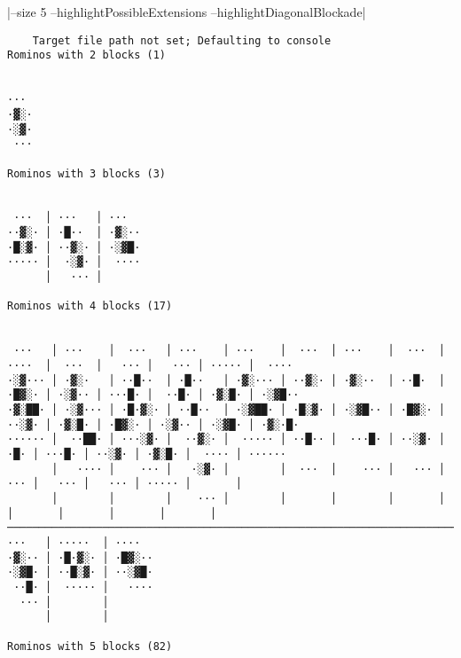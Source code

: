 \documentclass[a4paper,10pt,ngerman]{scrartcl}
\begin{document}
|--size 5 --highlightPossibleExtensions --highlightDiagonalBlockade|

\begin{lstlisting}
    Target file path not set; Defaulting to console
Rominos with 2 blocks (1)


···
·▓░·
·░▓·
 ···

Rominos with 3 blocks (3)


 ···  │ ···   │ ···
··▓░· │ ·█··  │ ·▓░··
·█░▓· │ ··▓░· │ ·░▓█·
····· │  ·░▓· │  ····
      │   ··· │

Rominos with 4 blocks (17)


 ···   │ ···    │  ···   │ ···    │ ···    │  ···  │ ···    │  ···  │ ····  │  ···  │   ··· │   ··· │ ····· │  ····
·░▓··· │ ·▓░·   │ ··█··  │ ·█··   │ ·▓░··· │ ··▓░· │ ·▓░··  │ ··█·  │ ·█▓░· │ ·░▓·· │ ···█· │  ··█· │ ·▓░█· │ ·░▓█··
·▓░██· │ ·░▓··· │ ·█·▓░· │ ··█··  │ ·░▓██· │ ·█░▓· │ ·░▓█·· │ ·█▓░· │ ··░▓· │ ·▓░█· │ ·█▓░· │ ·░▓·· │ ·░▓█· │ ·▓░·█·
······ │  ··██· │ ···░▓· │  ··▓░· │  ····· │ ··█·· │  ···█· │ ··░▓· │   ·█· │ ···█· │ ··░▓· │ ·▓░█· │  ···· │ ······
       │   ···· │    ··· │   ·░▓· │        │  ···  │    ··· │   ··· │   ··· │   ··· │   ··· │ ····· │       │
       │        │        │    ··· │        │       │        │       │       │       │       │       │       │
────────────────────────────────────────────────────────────────────────────────────────────────────────────────────
···   │ ·····  │ ····
·▓░·· │ ·█·▓░· │ ·█▓░··
·░▓█· │ ··█░▓· │ ··░▓█·
 ··█· │  ····· │   ····
  ··· │        │
      │        │

Rominos with 5 blocks (82)



\end{lstlisting}
\end{document}
